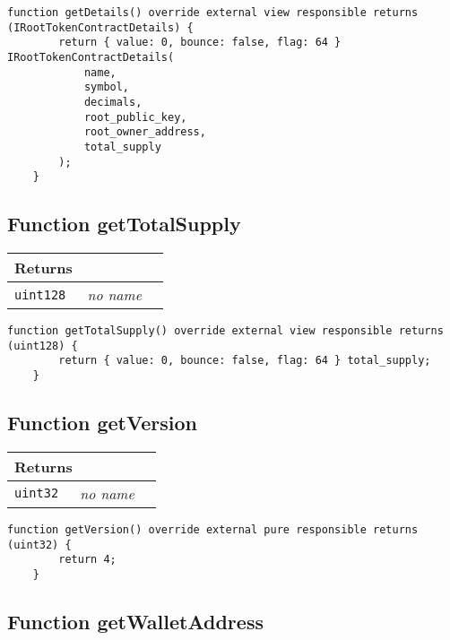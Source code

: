 \vspace{2cm}

\begin{lstlisting}[firstnumber=77]
    function getDetails() override external view responsible returns (IRootTokenContractDetails) {
        return { value: 0, bounce: false, flag: 64 } IRootTokenContractDetails(
            name,
            symbol,
            decimals,
            root_public_key,
            root_owner_address,
            total_supply
        );
    }
\end{lstlisting}

\subsection{Function getTotalSupply}


\ifsoltables
\noindent\begin{tabular}{|l|l|p{5cm}|}\hline
\multicolumn{3}{|l|}{\bf Returns}\\\hline
\tt uint128 & {\em no name} &\\\hline
\end{tabular}
\fi

\vspace{2cm}

\begin{lstlisting}[firstnumber=92]
    function getTotalSupply() override external view responsible returns (uint128) {
        return { value: 0, bounce: false, flag: 64 } total_supply;
    }
\end{lstlisting}

\subsection{Function getVersion}


\ifsoltables
\noindent\begin{tabular}{|l|l|p{5cm}|}\hline
\multicolumn{3}{|l|}{\bf Returns}\\\hline
\tt uint32 & {\em no name} &\\\hline
\end{tabular}
\fi

\vspace{2cm}

\begin{lstlisting}[firstnumber=63]
    function getVersion() override external pure responsible returns (uint32) {
        return 4;
    }
\end{lstlisting}

\subsection{Function getWalletAddress}


